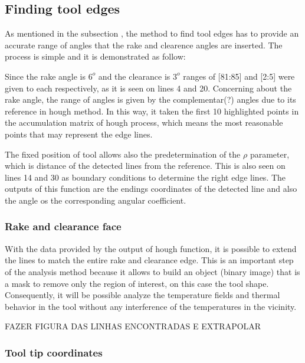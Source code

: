 	\subsection{Finding tool edges}

	As mentioned in the subsection , the method to find tool edges has to provide an accurate range of angles that the rake and clearence angles are inserted. The process is simple and it is demonstrated as follow:

	

	Since the rake angle is $6^{o}$ and the clearance is $3^{o}$ ranges of [81:85] and [2:5] were given to each respectively, as it is seen on lines 4 and 20. Concerning about the rake angle, the range of angles is given by the complementar(?) angles due to its reference in hough method. In this way, it taken the first 10 highlighted points in the accumulation matrix of hough process, which means the most reasonable points that may represent the edge lines.

	The fixed position of tool allows also the predetermination of the $\rho$ parameter, which is distance of the detected lines from the reference. This is also seen on lines 14 and 30 as boundary conditions to determine the right edge lines. The outputs of this function are the endings coordinates of the detected line and also the angle os the corresponding angular coefficient. 


		\subsubsection{Rake and clearance face}

		With the data provided by the output of hough function, it is possible to extend the lines to match the entire rake and clearance edge. This is an important step of the analysis method because it allows to build an object (binary image) that is a mask to remove only the region of interest, on this case the tool shape. Consequently, it will be possible analyze the temperature fields and thermal behavior in the tool without any interference of the temperatures in the vicinity.

		FAZER FIGURA DAS LINHAS ENCONTRADAS E EXTRAPOLAR

		\subsubsection{Tool tip coordinates}

